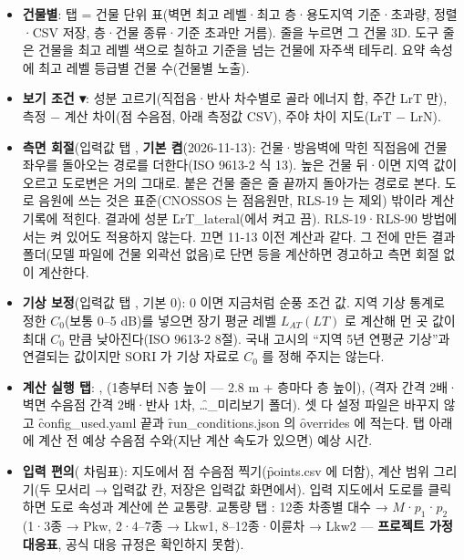 \documentclass[10.5pt,a4paper]{article}
\begin{document}
\begin{itemize}
\item \textbf{건물별}:  탭 = 건물 단위 표(벽면 최고 레벨·최고 층·용도지역 기준·초과량, 정렬·CSV 저장, 층·건물 종류·기준 초과만 거름). 줄을 누르면 그 건물 3D. 도구 줄 은 건물을 최고 레벨 색으로 칠하고 기준을 넘는 건물에 자주색 테두리. 요약 속성에 최고 레벨 등급별 건물 수(건물별 노출).
\item \textbf{보기 조건 ▾}: 성분 고르기(직접음·반사 차수별로 골라 에너지 합, 주간 LrT 만), 측정 − 계산 차이(점 수음점, 아래 측정값 CSV), 주야 차이 지도(LrT − LrN).
\item \textbf{측면 회절}(입력값  탭 , \textbf{기본 켬}(2026-11-13): 건물·방음벽에 막힌 직접음에 건물 좌우를 돌아오는 경로를 더한다(ISO 9613-2 식 13). 높은 건물 뒤·이면 지역 값이 오르고 도로변은 거의 그대로. 붙은 건물 줄은 줄 끝까지 돌아가는 경로로 본다. 도로 음원에 쓰는 것은 표준(CNOSSOS 는 점음원만, RLS-19 는 제외) 밖이라 계산 기록에 적힌다. 결과에 성분 \f{LrT\_lateral}(에서 켜고 끔). RLS-19·RLS-90 방법에서는 켜 있어도 적용하지 않는다. 끄면 11-13 이전 계산과 같다. 그 전에 만든 결과 폴더(모델 파일에 건물 외곽선 없음)로 단면 등을 계산하면 경고하고 측면 회절 없이 계산한다.
\item \textbf{기상 보정}(입력값  탭 , 기본 0): 0 이면 지금처럼 순풍 조건 값. 지역 기상 통계로 정한 $C_0$(보통 0–5 dB)를 넣으면 장기 평균 레벨 $L_{AT}(LT)$ 로 계산해 먼 곳 값이 최대 $C_0$ 만큼 낮아진다(ISO 9613-2 8절). 국내 고시의 ``지역 5년 연평균 기상''과 연결되는 값이지만 SORI 가 기상 자료로 $C_0$ 를 정해 주지는 않는다.
\item \textbf{계산 실행 탭}: , (1층부터 N층 높이 — 2.8 m + 층마다 층 높이), (격자 간격 2배·벽면 수음점 간격 2배·반사 1차, \f{…\_미리보기} 폴더). 셋 다 설정 파일은 바꾸지 않고 \f{config\_used.yaml} 끝과 \f{run\_conditions.json} 의 \f{overrides} 에 적는다. 탭 아래에 계산 전 예상 수음점 수와(지난 계산 속도가 있으면) 예상 시간.
\item \textbf{입력 편의}( 차림표): 지도에서 점 수음점 찍기(\f{points.csv} 에 더함), 계산 범위 그리기(두 모서리 → 입력값 칸, 저장은 입력값 화면에서). 입력 지도에서 도로를 클릭하면 도로 속성과 계산에 쓴 교통량. 교통량 탭 : 12종 차종별 대수 → $M$·$p_1$·$p_2$(1·3종 → Pkw, 2·4–7종 → Lkw1, 8–12종·이륜차 → Lkw2 — \textbf{프로젝트 가정 대응표}, 공식 대응 규정은 확인하지 못함).
\end{itemize}
\end{document}
